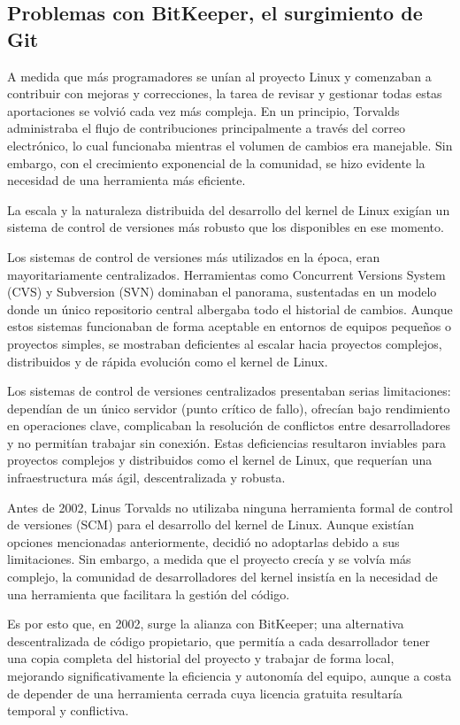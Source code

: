 \documentclass[a4paper,12pt]{article}
\begin{document}
\subsection{Problemas con BitKeeper, el surgimiento de Git}

A medida que más programadores se unían al proyecto Linux y comenzaban a
contribuir con mejoras y correcciones, la tarea de revisar y gestionar todas
estas aportaciones se volvió cada vez más compleja. En un principio,
Torvalds administraba el flujo de contribuciones principalmente a través del
correo electrónico, lo cual funcionaba mientras el volumen de cambios era
manejable. Sin embargo, con el crecimiento exponencial de la comunidad, se hizo
evidente la necesidad de una herramienta más eficiente.

La escala y la naturaleza distribuida del desarrollo del kernel de Linux exigían
un sistema de control de versiones más robusto que los disponibles en ese
momento.

Los sistemas de control de versiones más utilizados en la época,
eran mayoritariamente centralizados. Herramientas como Concurrent Versions
System (CVS) y Subversion (SVN) dominaban el panorama, sustentadas en un modelo
donde un único repositorio central albergaba todo el historial de cambios.
Aunque estos sistemas funcionaban de forma aceptable en entornos de equipos
pequeños o proyectos simples, se mostraban deficientes al escalar hacia
proyectos complejos, distribuidos y de rápida evolución como el kernel de Linux.

Los sistemas de control de versiones centralizados presentaban serias
limitaciones: dependían de un único servidor (punto crítico de fallo), ofrecían
bajo rendimiento en operaciones clave, complicaban la resolución de conflictos
entre desarrolladores y no permitían trabajar sin conexión. Estas deficiencias
resultaron inviables para proyectos complejos y distribuidos como el kernel de
Linux, que requerían una infraestructura más ágil, descentralizada y robusta.

Antes de 2002, Linus Torvalds no utilizaba ninguna herramienta formal de control
de versiones (SCM) para el desarrollo del kernel de Linux. Aunque existían
opciones mencionadas anteriormente, decidió no adoptarlas debido a sus
limitaciones.  Sin embargo, a medida que el proyecto crecía y se volvía más
complejo, la comunidad de desarrolladores del kernel insistía en la necesidad de
una herramienta que facilitara la gestión del código.

Es por esto que, en 2002, surge la alianza con BitKeeper; una alternativa
descentralizada de código propietario, que permitía a cada desarrollador
tener una copia completa del historial del proyecto y trabajar de forma local,
mejorando significativamente la eficiencia y autonomía del equipo, aunque a
costa de depender de una herramienta cerrada cuya licencia gratuita resultaría
temporal y conflictiva.
\end{document}
